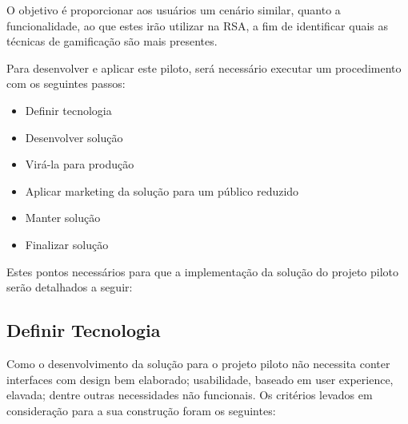O objetivo é proporcionar aos usuários um cenário similar, quanto a funcionalidade, ao que estes irão utilizar
na RSA, a fim de identificar quais as técnicas de gamificação são mais presentes.

Para desenvolver e aplicar este piloto, será necessário executar um procedimento com os seguintes passos:

\begin{itemize}
    \item Definir tecnologia
    \item Desenvolver solução
    \item Virá-la para produção
    \item Aplicar marketing da solução para um público reduzido
    \item Manter solução
    \item Finalizar solução
\end{itemize}

Estes pontos necessários para que a implementação da solução do projeto piloto serão detalhados a seguir:

\subsection{Definir Tecnologia}
\label{sub:definir_tecnologia}
Como o desenvolvimento da solução para o projeto piloto não necessita conter interfaces com design bem elaborado;
usabilidade, baseado em user experience, elavada; dentre outras necessidades não funcionais. Os critérios levados em
consideração para a sua construção foram os seguintes:

